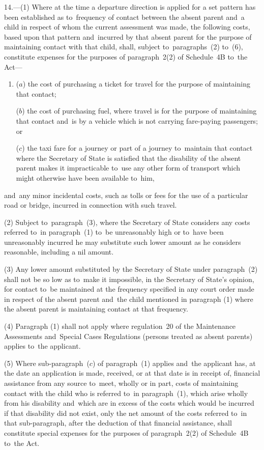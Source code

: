 \documentclass[12pt,a4paper]{article}
\begin{document}
14.—(1) Where at the time a departure direction is applied for a
set pattern has been established as to~frequency of contact between the absent
parent and~a child in respect of whom the current assessment was made, the
following costs, based upon that pattern and~incurred by that absent parent for
the purpose of maintaining contact with that child, shall, subject to~paragraphs~(2) to~(6), constitute expenses for the purposes of paragraph~2(2) of Schedule~4B to~the Act—
\begin{enumerate}\item[]
($a$) the cost of purchasing a ticket for travel for the purpose of maintaining
that contact;

($b$) the cost of purchasing fuel, where travel is for the purpose of maintaining
that contact and~is by a vehicle which is not carrying fare-paying passengers;
or

($c$) the taxi fare for a journey or part of a journey to~maintain that contact
where the Secretary of State is satisfied that the disability of the absent
parent makes it impracticable to~use any other form of transport which might
otherwise have been available to~him,
\end{enumerate}
and~any minor incidental costs, such as tolls or fees for the use of a
particular road or bridge, incurred in connection with such travel.

(2) Subject to~paragraph~(3), where the Secretary of State considers any costs
referred to~in paragraph~(1) to~be unreasonably high or to~have been
unreasonably incurred he may substitute such lower amount as he considers
reasonable, including a nil amount.

(3) Any lower amount substituted by the Secretary of State under paragraph~(2)
shall not be so low as to~make it impossible, in the Secretary of State’s
opinion, for contact to~be maintained at the frequency specified in any court
order made in respect of the absent parent and~the child mentioned in paragraph
(1) where the absent parent is maintaining contact at that frequency.

(4) Paragraph (1) shall not apply where regulation~20 of the Maintenance
Assessments and~Special Cases Regulations (persons treated as absent parents)
applies to~the applicant.

(5) Where sub-paragraph~($c$) of paragraph~(1) applies and~the applicant has, at
the date an application is made, received, or at that date is in receipt of,
financial assistance from any source to~meet, wholly or in part, costs of
maintaining contact with the child who is referred to~in paragraph~(1), which
arise wholly from his disability and~which are in excess of the costs which
would be incurred if that disability did not exist, only the net amount of the
costs referred to~in that sub-paragraph, after the deduction of that financial
assistance, shall constitute special expenses for the purposes of paragraph~2(2)
of Schedule~4B to~the Act.
\end{document}
